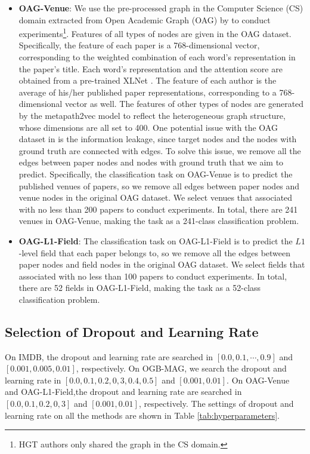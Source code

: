 \documentclass[10pt,journal,compsoc]{IEEEtran}
\newcommand{\citet}{\cite}
\newcommand{\tabref}[1]{Table \ref{#1}}
\begin{document}
\begin{itemize}
    \item \textbf{OAG-Venue}:
    We use the pre-processed graph in the Computer Science (CS) domain extracted from Open Academic Graph (OAG) by \citet{DBLP:conf/www/HuDWS20} to conduct experiments\footnote{HGT authors only shared the graph in the CS domain.}. Features of all types of nodes are given in the OAG dataset. Specifically, the feature of each paper is a 768-dimensional vector, corresponding to the weighted combination of each word's representation in the paper's title. Each word's representation and the attention score are obtained from a pre-trained XLNet \cite{DBLP:conf/nips/YangDYCSL19}. The feature of each author is the average of his/her published paper representations, corresponding to a 768-dimensional vector as well. The features of other types of nodes are generated by the metapath2vec model to reflect the heterogeneous graph structure, whose dimensions are all set to 400. One potential issue with the OAG dataset in \cite{DBLP:conf/www/HuDWS20} is the information leakage, since target nodes and the nodes with ground truth are connected with edges. To solve this issue, we remove all the edges between paper nodes and nodes with ground truth that we aim to predict. Specifically, the classification task on OAG-Venue is to predict the published venues of papers, so we remove all edges between paper nodes and venue nodes in the original OAG dataset. We select venues that associated with no less than 200 papers to conduct experiments. In total, there are 241 venues in OAG-Venue, making the task as a 241-class classification problem.
    
    \item \textbf{OAG-L1-Field}:
    The classification task on OAG-L1-Field is to predict the $L1$-level field that each paper belongs to, so we remove all the edges between paper nodes and field nodes in the original OAG dataset. We select fields that associated with no less than 100 papers to conduct experiments. In total, there are 52 fields in OAG-L1-Field, making the task as a 52-class classification problem. 
\end{itemize}


\subsection*{Selection of Dropout and Learning Rate} \label{section-appendix-hyper-parameters}
On IMDB, the dropout and learning rate are searched in $\left[0.0, 0.1, \cdots, 0.9\right]$ and $\left[0.001, 0.005, 0.01\right]$, respectively. On OGB-MAG, we search the dropout and learning rate in $\left[0.0, 0.1, 0.2, 0,3, 0.4, 0.5\right]$ and $\left[0.001, 0.01\right]$. On OAG-Venue and OAG-L1-Field,the dropout and learning rate are searched in $\left[0.0, 0.1, 0.2, 0,3\right]$ and $\left[0.001, 0.01\right]$, respectively. The settings of dropout and learning rate on all the methods are shown in \tabref{tab:hyperparameters}.
\end{document}
